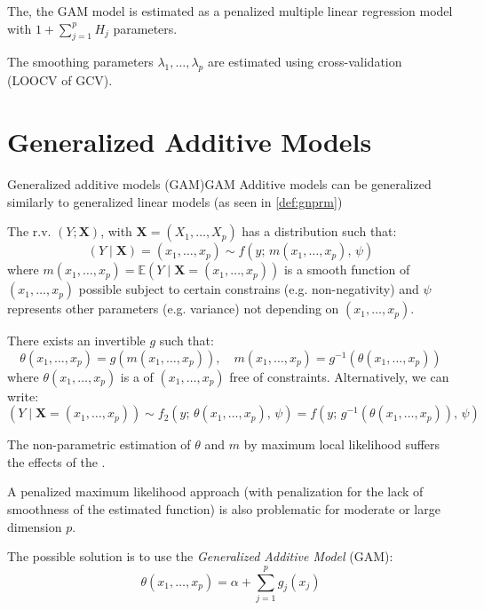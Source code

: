 The, the GAM model is estimated as a penalized multiple linear regression model with
$1 + \sum_{j=1}^p H_j$ parameters.

The smoothing parameters $\lambda_1,\dots,\lambda_p$ are estimated using cross-validation
(LOOCV of GCV).

\section{Generalized Additive Models}

\begin{definition}{Generalized additive models (GAM)}{GAM}
    Additive models can be generalized similarly to generalized linear models
    (as seen in \ref{def:gnprm})

The r.v. $(Y; \boldsymbol X)$, with $\boldsymbol X = (X_1,\dots,X_p)$ has a distribution such
that:
\begin{equation*}
    (Y \mid \boldsymbol X) = (x_1,\dots,x_p) \sim f(y;\,m(x_1, \ldots, x_p),\,\psi)
\end{equation*}
where $m(x_1, \ldots, x_p) = \mathds{E}(Y \mid \boldsymbol X = (x_1,\dots,x_p))$ is a
smooth function of $(x_1,\dots,x_p)$ possible subject to certain constrains (e.g. non-negativity)
and $\psi$ represents other parameters (e.g. variance) not depending on $(x_1,\dots,x_p)$.

There exists an invertible  $g$ such that:
\begin{equation*}
    \theta(x_1,\ldots,x_p) = g(m(x_1,\ldots,x_p)), \quad m(x_1,\ldots,x_p) = g^{-1}(\theta(x_1,\ldots,x_p))
\end{equation*}
where $\theta(x_1,\ldots,x_p)$ is a  of $(x_1,\ldots,x_p)$ free of
constraints.
\tcblower
Alternatively, we can write:
\begin{equation*}
    (Y \mid \boldsymbol X = (x_1,\dots,x_p)) \sim f_2(y;\,\theta(x_1, \ldots, x_p),\,\psi)
    = f(y;\,g^{-1}(\theta(x_1, \ldots, x_p)),\,\psi)
\end{equation*}
\end{definition}

The non-parametric estimation of $\theta$ and $m$ by maximum local
likelihood suffers the effects of the .

A penalized maximum likelihood approach (with penalization for the
lack of smoothness of the estimated function) is also problematic
for moderate or large dimension $p$.

The possible solution is to use the \emph{Generalized Additive Model} (GAM):
\begin{equation*}
    \theta(x_1,\ldots,x_p) = \alpha + \sum_{j=1}^p g_j(x_j)
\end{equation*}


